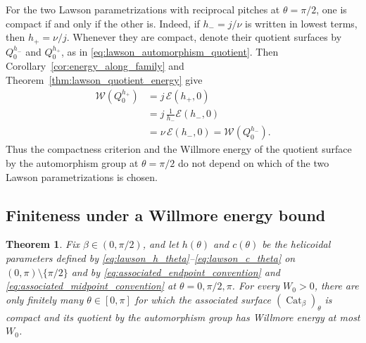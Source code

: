 \documentclass[a4paper,11pt]{amsart}
\numberwithin{equation}{section}
\theoremstyle{plain}
\newtheorem{thm}{Theorem}[section]
\newcommand{\Cat}{\operatorname{Cat}}
\begin{document}
For the two Lawson parametrizations with reciprocal pitches at
$\theta=\pi/2$, one is compact if and only if the other is. Indeed, if $h_-=j/\nu$ is
written in lowest terms, then $h_+=\nu/j$. Whenever they are compact,
denote their quotient surfaces by $Q_0^{h_-}$ and $Q_0^{h_+}$, as in
\eqref{eq:lawson_automorphism_quotient}. Then
Corollary~\ref{cor:energy_along_family} and
Theorem~\ref{thm:lawson_quotient_energy} give
\[
\begin{aligned}
\mathcal W(Q_0^{h_+})
&=j\,\mathcal E(h_+,0)\\
&=j\,\frac{1}{h_-}\mathcal E(h_-,0)\\
&=\nu\,\mathcal E(h_-,0)
 =\mathcal W(Q_0^{h_-}).
\end{aligned}
\]
Thus the compactness criterion and the Willmore energy of the quotient
surface by the automorphism group at $\theta=\pi/2$ do not depend
on which of the two Lawson parametrizations is chosen.

\subsection{Finiteness under a Willmore energy bound}

\begin{thm}\label{thm:finiteness}
Fix $\beta\in(0,\pi/2)$, and let $h(\theta)$ and $c(\theta)$ be the
helicoidal parameters defined by
\eqref{eq:lawson_h_theta}--\eqref{eq:lawson_c_theta} on
$(0,\pi)\setminus\{\pi/2\}$ and by
\eqref{eq:associated_endpoint_convention} and
\eqref{eq:associated_midpoint_convention} at
$\theta=0,\pi/2,\pi$. For every $W_0>0$, there are only finitely many
$\theta\in[0,\pi]$ for which the associated surface
$(\Cat_\beta)_\theta$ is compact and its quotient by the
automorphism group has Willmore energy at most $W_0$.
\end{thm}
\end{document}
